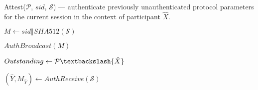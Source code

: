   \caption{Attest($\mathcal{P}$, $sid$, $\mathcal{S}$) --- authenticate previously unauthenticated protocol parameters for the current session in the context of participant $\hat{X}$.}
  \label{algo:attest}
  \Begin
  {
	$M \leftarrow sid \Vert SHA512(\mathcal{S})$

	$AuthBroadcast(M)$

	$Outstanding \leftarrow \mathcal{P} \textbackslash \{\hat{X}\}$

    {
      $(\hat{Y}, M_{\hat{Y}}) \leftarrow AuthReceive(\mathcal{S})$

      {
        \Return{$\perp$}

      }
    }

  }
